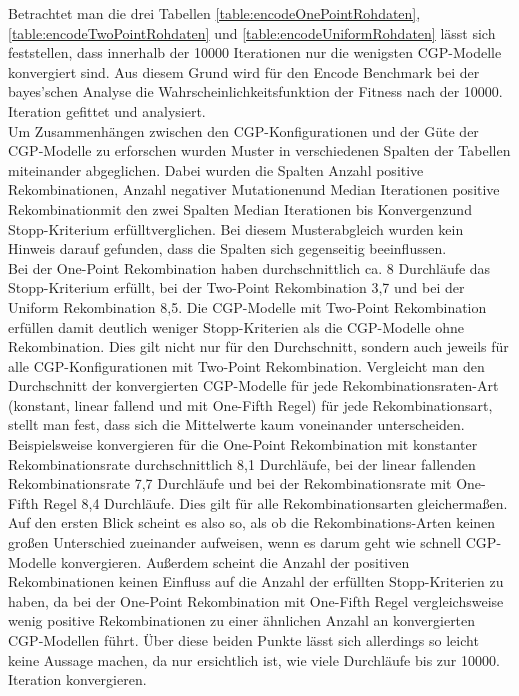 Betrachtet man die drei Tabellen \ref{table:encodeOnePointRohdaten}, \ref{table:encodeTwoPointRohdaten} und \ref{table:encodeUniformRohdaten} lässt sich feststellen, dass innerhalb der 10000 Iterationen nur die wenigsten CGP-Modelle konvergiert sind.
Aus diesem Grund wird für den Encode Benchmark bei der bayes'schen Analyse die Wahrscheinlichkeitsfunktion der Fitness nach der 10000. Iteration gefittet und analysiert.\\
Um Zusammenhängen zwischen den CGP-Konfigurationen und der Güte der CGP-Modelle zu erforschen wurden Muster in verschiedenen Spalten der Tabellen miteinander abgeglichen.
Dabei wurden die Spalten \glqq Anzahl positive Rekombinationen\grqq, \glqq Anzahl negativer Mutationen\grqq\space und \glqq Median Iterationen positive Rekombination\grqq\space mit den zwei Spalten \glqq Median Iterationen bis Konvergenz\grqq\space und \glqq Stopp-Kriterium erfüllt\grqq\space verglichen.
Bei diesem Musterabgleich wurden kein Hinweis darauf gefunden, dass die Spalten sich gegenseitig beeinflussen.\\
Bei der One-Point Rekombination haben durchschnittlich ca. 8 Durchläufe das Stopp-Kri\-te\-rium erfüllt, bei der Two-Point Rekombination 3,7 und bei der Uniform Rekombination 8,5. 
Die CGP-Modelle mit Two-Point Rekombination erfüllen damit deutlich weniger Stopp-Kriterien als die CGP-Modelle ohne Rekombination.
Dies gilt nicht nur für den Durchschnitt, sondern auch jeweils für alle CGP-Konfigurationen mit Two-Point Rekombination.
Vergleicht man den Durchschnitt der konvergierten CGP-Modelle für jede Re\-kom\-bi\-na\-tions\-ra\-ten-Art (konstant, linear fallend und mit One-Fifth Regel) für jede Rekombinationsart, stellt man fest, dass sich die Mittelwerte kaum voneinander unterscheiden.
Beispielsweise konvergieren für die One-Point Rekombination mit konstanter Rekombinationsrate durchschnittlich 8,1 Durchläufe, bei der linear fallenden Rekombinationsrate 7,7 Durchläufe und bei der Rekombinationsrate mit One-Fifth Regel 8,4 Durchläufe. 
Dies gilt für alle Rekombinationsarten gleichermaßen.
Auf den ersten Blick scheint es also so, als ob die Rekombinations-Arten keinen großen Unterschied zueinander aufweisen, wenn es darum geht wie schnell CGP-Modelle konvergieren.
Außerdem scheint die Anzahl der positiven Rekombinationen keinen Einfluss auf die Anzahl der erfüllten Stopp-Kriterien zu haben, da bei der One-Point Rekombination mit One-Fifth Regel vergleichsweise wenig positive Rekombinationen zu einer ähnlichen Anzahl an konvergierten CGP-Modellen führt.
Über diese beiden Punkte lässt sich allerdings so leicht keine Aussage machen, da nur ersichtlich ist, wie viele Durchläufe bis zur 10000. Iteration konvergieren.
